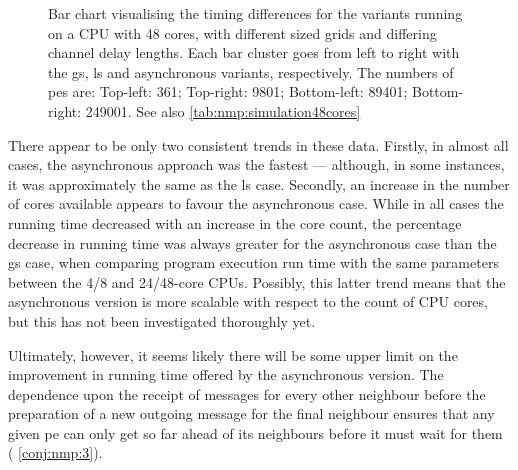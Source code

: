 \begin{figure}
    \caption[Bar chart visualising the timing differences for the variants on a 48-core CPU]{Bar chart visualising the timing differences for the variants running on a CPU with 48 cores, with different sized grids and differing channel delay lengths.  Each bar cluster goes from left to right with the \gls{gs}, \gls{ls} and asynchronous variants, respectively.  The numbers of \glspl{pe} are:  Top-left: 361;  Top-right:  \num{9 801};  Bottom-left:  \num{89 401};  Bottom-right:  \num{249 001}.  See also \cref{tab:nmp:simulation48cores}}
    \label{fig:nmp:timings48cores}
\end{figure}

There appear to be only two consistent trends in these data.  Firstly, in almost all cases, the asynchronous approach was the fastest --- although, in some instances, it was approximately the same as the \gls{ls} case.  Secondly, an increase in the number of cores available appears to favour the asynchronous case.  While in all cases the running time decreased with an increase in the core count, the percentage decrease in running time was always greater for the asynchronous case than the \gls{gs} case, when comparing program execution run time with the same parameters between the 4/8 and 24/48-core CPUs.  Possibly, this latter trend means that the asynchronous version is more scalable with respect to the count of CPU cores, but this has not been investigated thoroughly yet.

Ultimately, however, it seems likely there will be some upper limit on the improvement in running time offered by the asynchronous version.  The dependence upon the receipt of messages for every other neighbour before the preparation of a new outgoing message for the final neighbour ensures that any given \gls{pe} can only get so far ahead of its neighbours before it must wait for them (\ala{} \cref{conj:nmp:3}).

